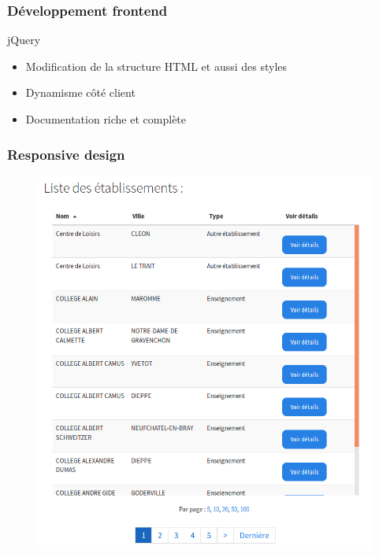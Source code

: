 \begin{frame}
\frametitle{Développement frontend}
\begin{block}{jQuery }
	\begin{itemize}
		\item Modification de la structure HTML et aussi des styles
		\item Dynamisme côté client
		\item Documentation riche et complète
	\end{itemize}
\end{block}
\end{frame}

\begin{frame}
\frametitle{Responsive design}
	\begin{multicols}{2}
		\begin{figure}[!h]
			\begin{center}
				\includegraphics[scale=0.19]{images/screenshot1.png}


\end{center}
\end{figure}
\end{multicols}
\end{frame}
